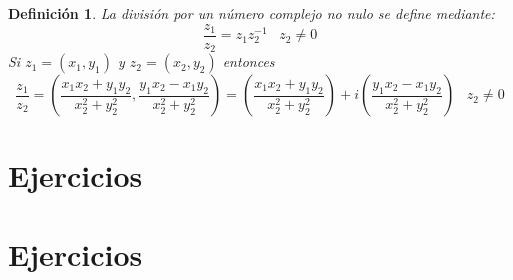 \documentclass[10pt]{book}
\newtheorem{def.}{\textbf{Definición}}[chapter]%
\begin{document}
\begin{tcolorbox}[colback=white]
    \begin{def.}
	La división por un número complejo no nulo se define mediante: 
	$$\dfrac{z_1}{z_2}=z_1 z_2^{-1} \; \; \; z_2\neq 0$$
	Si $z_1=(x_1,y_1)$ y $z_2=(x_2,y_2)$ entonces 
	$$\dfrac{z_1}{z_2}=\left( \dfrac{x_1 x_2 + y_1 y_2}{x_2^2 + y_2^2}, \dfrac{y_1 x_2 - x_1 y_2}{x_2^2 + y_2^2} \right)= \left( \dfrac{x_1 x_2 + y_1 y_2}{x_2^2 + y_2^2}  \right) + i \left( \dfrac{y_1 x_2 - x_1 y_2}{x_2^2 + y_2^2} \right) \;\;\; z_2 \neq 0$$
    \end{def.}
\end{tcolorbox}

\section{Ejercicios}
\section{Ejercicios}
\end{document}
